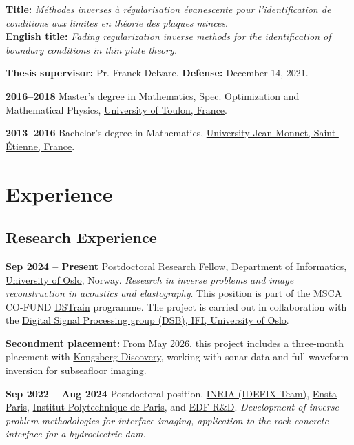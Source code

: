 \documentclass[10pt]{article}
\begin{document}
\textbf{Title:} \textit{Méthodes inverses à régularisation évanescente pour l'identification de conditions aux limites en théorie des plaques minces}.  \\
\textbf{English title:} \textit{Fading regularization inverse methods for the identification of boundary conditions in thin plate theory.}  

\textbf{Thesis supervisor:} Pr. Franck Delvare. \quad \textbf{Defense:} December 14, 2021.


\textbf{2016--2018} \quad Master's degree in Mathematics, Spec. Optimization and Mathematical Physics, \href{https://www.univ-tln.fr/}{University of Toulon, France}.  

\textbf{2013--2016} \quad Bachelor's degree in Mathematics, \href{https://www.univ-st-etienne.fr/}{University Jean Monnet, Saint-Étienne, France}.  

\section{Experience}
\subsection{Research Experience}

\textbf{Sep 2024 -- Present} \quad Postdoctoral Research Fellow,  
\href{https://www.mn.uio.no/ifi/english/}{Department of Informatics},  
\href{https://www.uio.no/}{University of Oslo}, Norway.   \textit{Research in inverse problems and image reconstruction in acoustics and elastography}. 
This position is part of the MSCA CO-FUND \href{https://www.uio.no/dscience/english/dstrain/postdoctoral-fellows/aziz-boukraa.html}{DSTrain} programme.  The project is carried out in collaboration with the  
\href{https://www.mn.uio.no/ifi/english/research/groups/dsp/}{Digital Signal Processing group (DSB), IFI, University of Oslo}. 

\textbf{Secondment placement:} From May 2026, this project includes a three-month placement with \href{https://www.kongsberg.com/discovery/}{Kongsberg Discovery}, working with sonar data and full-waveform inversion for subseafloor imaging.



\textbf{Sep 2022 -- Aug 2024} \quad Postdoctoral position.  
\href{https://uma.ensta-paris.fr/idefix/}{INRIA (IDEFIX Team)}, \href{https://www.ensta-paris.fr/}{Ensta Paris}, \href{https://www.ip-paris.fr/}{Institut Polytechnique de Paris}, and \href{https://www.edf.fr/}{EDF R\&D}.  
\textit{Development of inverse problem methodologies for interface imaging, application to the rock-concrete interface for a hydroelectric dam.}
\end{document}
